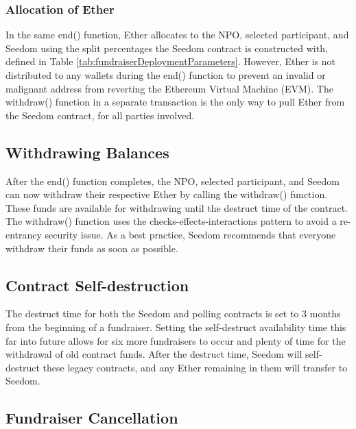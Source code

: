 \documentclass[11pt]{article}
\begin{document}
\subsubsection{Allocation of Ether}

In the same end() function, Ether allocates to the NPO, selected participant, and Seedom using the split percentages the Seedom contract is constructed with, defined in Table \ref{tab:fundraiserDeploymentParameters}. However, Ether is not distributed to any wallets during the end() function to prevent an invalid or malignant address from reverting the Ethereum Virtual Machine (EVM). The withdraw() function in a separate transaction is the only way to pull Ether from the Seedom contract, for all parties involved.

\subsection{Withdrawing Balances}

After the end() function completes, the NPO, selected participant, and Seedom can now withdraw their respective Ether by calling the withdraw() function. These funds are available for withdrawing until the destruct time of the contract. The withdraw() function uses the checks-effects-interactions pattern \cite{7} to avoid a re-entrancy security issue. As a best practice, Seedom recommends that everyone withdraw their funds as soon as possible.

\subsection{Contract Self-destruction}
\label{sec:contractSelfDestruction}

The destruct time for both the Seedom and polling contracts is set to 3 months from the beginning of a fundraiser. Setting the self-destruct availability time this far into future allows for six more fundraisers to occur and plenty of time for the withdrawal of old contract funds. After the destruct time, Seedom will self-destruct these legacy contracts, and any Ether remaining in them will transfer to Seedom.

\subsection{Fundraiser Cancellation}
\label{sec:fundraiserCancellation}
\end{document}
